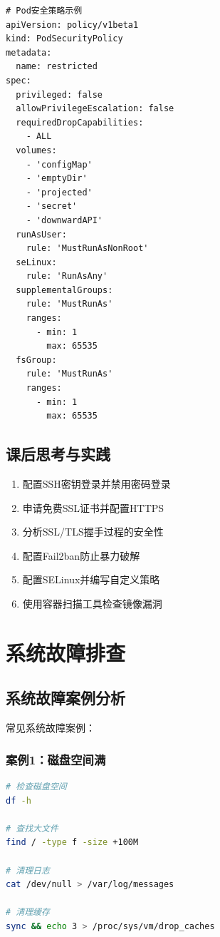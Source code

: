 \documentclass[12pt,UTF8]{ctexbook}
\begin{document}
\begin{lstlisting}
# Pod安全策略示例
apiVersion: policy/v1beta1
kind: PodSecurityPolicy
metadata:
  name: restricted
spec:
  privileged: false
  allowPrivilegeEscalation: false
  requiredDropCapabilities:
    - ALL
  volumes:
    - 'configMap'
    - 'emptyDir'
    - 'projected'
    - 'secret'
    - 'downwardAPI'
  runAsUser:
    rule: 'MustRunAsNonRoot'
  seLinux:
    rule: 'RunAsAny'
  supplementalGroups:
    rule: 'MustRunAs'
    ranges:
      - min: 1
        max: 65535
  fsGroup:
    rule: 'MustRunAs'
    ranges:
      - min: 1
        max: 65535
\end{lstlisting}

\section{课后思考与实践}
\label{sec:security-practice}
\begin{enumerate}
    \item 配置SSH密钥登录并禁用密码登录
    \item 申请免费SSL证书并配置HTTPS
    \item 分析SSL/TLS握手过程的安全性
    \item 配置Fail2ban防止暴力破解
    \item 配置SELinux并编写自定义策略
    \item 使用容器扫描工具检查镜像漏洞
\end{enumerate}

\chapter{系统故障排查}
\label{chap:troubleshooting}

\section{系统故障案例分析}
\label{sec:fault-cases}

常见系统故障案例：

\subsection*{案例1：磁盘空间满}
\begin{lstlisting}[language=bash]
# 检查磁盘空间
df -h

# 查找大文件
find / -type f -size +100M

# 清理日志
cat /dev/null > /var/log/messages

# 清理缓存
sync && echo 3 > /proc/sys/vm/drop_caches
\end{lstlisting}
\end{document}
